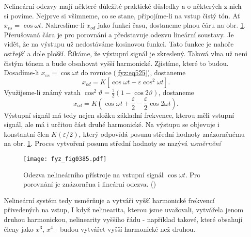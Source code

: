   Nelineární odezvy mají některé důležité praktické důsledky a o některých z nich si povíme. 
  Nejprve si všimneme, co se stane, připojíme-li na vstup čistý tón. Ať \(x_{vs} = \cos\omega t\). 
  Nakreslíme-li \(x_{od}\) jako funkci času, dostaneme plnou čáru na obr. \ref{fyz:fig0385}. 
  Přerušovaná čára je pro porovnání a představuje odezvu lineární soustavy. Je vidět, že na výstupu 
  už nedostáváme kosinovou funkci. Tato funkce je nahoře ostřejší a dole plošší. Říkáme, že 
  výstupní signál je zkreslený. Taková vlna už není čistým tónem a bude obsahovat vyšší harmonické. 
  Zjistíme, které to budou. Dosadíme-li \(x_{vs} = \cos\omega t\) do rovnice (\ref{fyz:eq525}), 
  dostaneme
  \begin{equation}\label{fyz:eq524}
    x_{od} = K[\cos\omega t + \varepsilon\cos^2\omega t ]. 
  \end{equation}
  Využijeme-li známý vztah \(\cos^2\vartheta = \frac{1}{2}(1 - \cos2\vartheta)\), dostaneme 
  \begin{equation}\label{fyz:eq526}
    x_{od} = K\left(\cos\omega t+\frac{\varepsilon}{2}-\frac{\varepsilon}{2}\cos2\omega t\right). 
  \end{equation}
  Výstupní signál má tedy nejen složku základní frekvence, kterou měli vstupní signál, ale má i 
  určitou část druhé harmonické. Na výstupu se objevuje i konstantní člen \(K(\varepsilon/2)\), 
  který odpovídá posunu střední hodnoty znázorněnému na obr. \ref{fyz:fig0385}. Proces vytvoření 
  posunu střední hodnoty se nazývá \emph{usměrnění}
  
  \begin{figure}[ht!] %
    \centering
    \texttt{[image: fyz\_fig0385.pdf]}
    \caption{Odezva nelineárního přístroje na vstupní signál \(\cos\omega t\). Pro porovnání je 
             znázorněna i lineární odezva.
             (\cite[s.~682]{Feynman01})}
    \label{fyz:fig0385}
  \end{figure}
  
  Nelineární systém tedy usměrňuje a vytváří vyšší harmonické frekvencí přivedených na vstup, I 
  když nelinearita, kterou jsme uvažovali, vytvářela jenom druhou harmonickou, nelinearity vyššího 
  řádu - například takové, které obsahují členy jako \(x^3\), \(x^4\) - budou vytvářet vyšší 
  harmonické než druhou.
  
